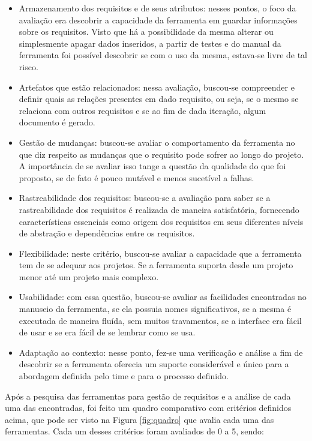 \begin{itemize}
  \item Armazenamento dos requisitos e de seus atributos: nesses pontos, o foco da avaliação era descobrir a capacidade da ferramenta em guardar informações sobre os requisitos. Visto que há a possibilidade da mesma alterar ou simplesmente apagar dados inseridos, a partir de testes e do manual da ferramenta foi possível descobrir se com o uso da mesma, estava-se livre de tal risco.

  \item Artefatos que estão relacionados: nessa avaliação, buscou-se compreender e definir quais as relações presentes em dado requisito, ou seja, se o mesmo se relaciona com outros requisitos e se ao fim de dada iteração, algum documento é gerado.

  \item Gestão de mudanças: buscou-se avaliar o comportamento da ferramenta no que diz respeito as mudanças que o requisito pode sofrer ao longo do projeto. A importância de se avaliar isso tange a questão da qualidade do que foi proposto, se de fato é pouco mutável e menos sucetível a falhas.

  \item Rastreabilidade dos requisitos: buscou-se a avaliação para saber se a rastreabilidade dos requisitos é realizada de maneira satisfatória, fornecendo características essenciais como origem dos requisitos em seus diferentes níveis de abstração e dependências entre os requisitos.

  \item Flexibilidade: neste critério, buscou-se avaliar a capacidade que a ferramenta tem de se adequar aos projetos. Se a ferramenta suporta desde um projeto menor até um projeto mais complexo.

  \item Usabilidade: com essa questão, buscou-se avaliar as facilidades encontradas no manuseio da ferramenta, se ela possuia nomes significativos, se a mesma é executada de maneira fluída, sem muitos travamentos, se a interface era fácil de usar e se era fácil de se lembrar como se usa.
  
  \item Adaptação ao contexto: nesse ponto, fez-se uma verificação e análise a fim de descobrir se a ferramenta oferecia um suporte considerável e 
  único para a abordagem definida pelo time e para o processo definido.
\end{itemize}

Após a pesquisa das ferramentas para gestão de requisitos e a análise de cada uma das encontradas, foi feito um quadro 
comparativo com critérios definidos acima, que pode ser visto na Figura \ref{fig:quadro} que avalia cada uma das ferramentas. Cada um desses critérios foram avaliados de 0 a 5, sendo:

